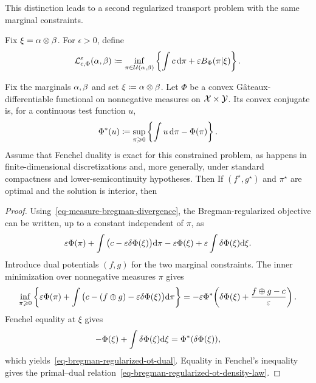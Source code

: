 This distinction leads to a second regularized transport problem with the same marginal constraints.
\begin{defn}\label{def-bregman-regularized-ot}
Fix $\xi=\alpha\otimes\beta$. For $\epsilon>0$, define
\[
	\mathcal{L}_{c,\Phi}^{\varepsilon}(\alpha,\beta)
	\coloneqq
	\inf_{\pi\in\mathcal{U}(\alpha,\beta)}
	\left\{\int c\,\mathrm{d}\pi+\varepsilon B_\Phi(\pi|\xi)\right\}.
\]
\end{defn}

\begin{prop}\label{prop-bregman-regularized-ot-dual}
	Fix the marginals $\alpha,\beta$ and set $\xi\coloneqq\alpha\otimes\beta$. Let $\Phi$ be a convex G\^ateaux-differentiable functional on nonnegative measures on $\mathcal{X}\times\mathcal{Y}$. Its convex conjugate is, for a continuous test function $u$,
	\[
		\Phi^*(u)
		\coloneqq
		\sup_{\pi\geqslant0}
		\left\{
			\int u\,\mathrm{d}\pi-\Phi(\pi)
		\right\}.
	\]
	Assume that Fenchel duality is exact for this constrained problem, as happens in finite-dimensional discretizations and, more generally, under standard compactness and lower-semicontinuity hypotheses. Then
	If $(f^\star,g^\star)$ and $\pi^\star$ are optimal and the solution is interior, then
\end{prop}

\begin{proof}
	Using~\eqref{eq-measure-bregman-divergence}, the Bregman-regularized objective can be written, up to a constant independent of $\pi$, as
	\[
		\varepsilon\Phi(\pi)
		+
		\int\big(c-\varepsilon\delta\Phi(\xi)\big)\mathrm{d}\pi
		-\varepsilon\Phi(\xi)+\varepsilon\int\delta\Phi(\xi)\mathrm{d}\xi.
	\]
	Introduce dual potentials $(f,g)$ for the two marginal constraints. The inner minimization over nonnegative measures $\pi$ gives
	\[
		\inf_{\pi\geqslant0}
		\left\{
			\varepsilon\Phi(\pi)
			+
			\int
				\big(c-(f\oplus g)-\varepsilon\delta\Phi(\xi)\big)
			\mathrm{d}\pi
		\right\}
		=
		-\varepsilon
		\Phi^*\!\left(
			\delta\Phi(\xi)+\frac{f\oplus g-c}{\varepsilon}
		\right).
	\]
	Fenchel equality at $\xi$ gives
	\[
		-\Phi(\xi)+\int\delta\Phi(\xi)\mathrm{d}\xi
		=
		\Phi^*(\delta\Phi(\xi)),
	\]
	which yields~\eqref{eq-bregman-regularized-ot-dual}. Equality in Fenchel's inequality gives the primal--dual relation~\eqref{eq-bregman-regularized-ot-density-law}.
\end{proof}

